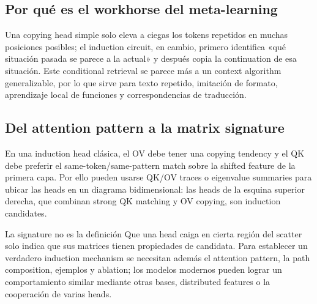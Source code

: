 \subsection{Por qué es el workhorse del meta-learning}

Una copying head simple solo eleva a ciegas los tokens repetidos en muchas posiciones posibles; el induction circuit, en cambio, primero identifica «qué situación pasada se parece a la actual» y después copia la continuation de esa situación. Este conditional retrieval se parece más a un context algorithm generalizable, por lo que sirve para texto repetido, imitación de formato, aprendizaje local de funciones y correspondencias de traducción.



\subsection{Del attention pattern a la matrix signature}

En una induction head clásica, el OV debe tener una copying tendency y el QK debe preferir el same-token/same-pattern match sobre la shifted feature de la primera capa. Por ello pueden usarse QK/OV traces o eigenvalue summaries para ubicar las heads en un diagrama bidimensional: las heads de la esquina superior derecha, que combinan strong QK matching y OV copying, son induction candidates.



\begin{warningbox}{La signature no es la definición}
Que una head caiga en cierta región del scatter solo indica que sus matrices tienen propiedades de candidata. Para establecer un verdadero induction mechanism se necesitan además el attention pattern, la path composition, ejemplos y ablation; los modelos modernos pueden lograr un comportamiento similar mediante otras bases, distributed features o la cooperación de varias heads.
\end{warningbox}

